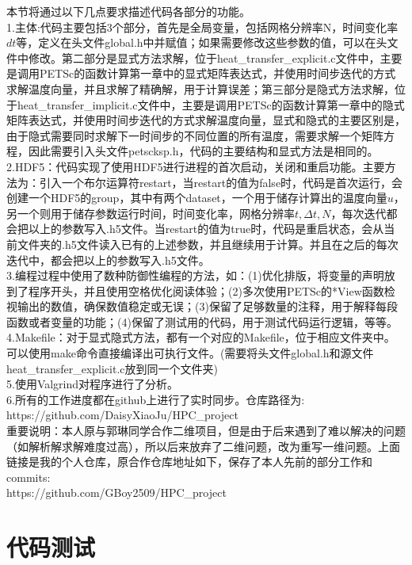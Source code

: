 \documentclass{article}
\begin{document}
		本节将通过以下几点要求描述代码各部分的功能。\\
		1.主体:代码主要包括3个部分，首先是全局变量，包括网格分辨率N，时间变化率$dt$等，定义在头文件global.h中并赋值；如果需要修改这些参数的值，可以在头文件中修改。第二部分是显式方法求解，位于heat\_transfer\_explicit.c文件中，主要是调用PETSc的函数计算第一章中的显式矩阵表达式，并使用时间步迭代的方式求解温度向量，并且求解了精确解，用于计算误差；第三部分是隐式方法求解，位于heat\_transfer\_implicit.c文件中，主要是调用PETSc的函数计算第一章中的隐式矩阵表达式，并使用时间步迭代的方式求解温度向量，显式和隐式的主要区别是，由于隐式需要同时求解下一时间步的不同位置的所有温度，需要求解一个矩阵方程，因此需要引入头文件petscksp.h，代码的主要结构和显式方法是相同的。
		\\
		2.HDF5：代码实现了使用HDF5进行进程的首次启动，关闭和重启功能。主要方法为：引入一个布尔运算符restart，当restart的值为false时，代码是首次运行，会创建一个HDF5的group，其中有两个dataset，一个用于储存计算出的温度向量$u$，另一个则用于储存参数运行时间，时间变化率，网格分辨率$t,\Delta t,N$，每次迭代都会把以上的参数写入.h5文件。当restart的值为true时，代码是重启状态，会从当前文件夹的.h5文件读入已有的上述参数，并且继续用于计算。并且在之后的每次迭代中，都会把以上的参数写入.h5文件。
		\\
		3.编程过程中使用了数种防御性编程的方法，如：(1)优化排版，将变量的声明放到了程序开头，并且使用空格优化阅读体验；(2)多次使用PETSc的*View函数检视输出的数值，确保数值稳定或无误；(3)保留了足够数量的注释，用于解释每段函数或者变量的功能；(4)保留了测试用的代码，用于测试代码运行逻辑，等等。
		\\
		4.Makefile：对于显式隐式方法，都有一个对应的Makefile，位于相应文件夹中。可以使用make命令直接编译出可执行文件。(需要将头文件global.h和源文件heat\_transfer\_explicit.c放到同一个文件夹)
		\\
		5.使用Valgrind对程序进行了分析。
		\\
		6.所有的工作进度都在github上进行了实时同步。仓库路径为:
		\\https://github.com/DaisyXiaoJu/HPC\_project
		\\重要说明：本人原与郭琳同学合作二维项目，但是由于后来遇到了难以解决的问题（如解析解求解难度过高），所以后来放弃了二维问题，改为重写一维问题。上面链接是我的个人仓库，原合作仓库地址如下，保存了本人先前的部分工作和commits:
		\\https://github.com/GBoy2509/HPC\_project
		
		
		\clearpage
		
		\section{代码测试}
\end{document}
